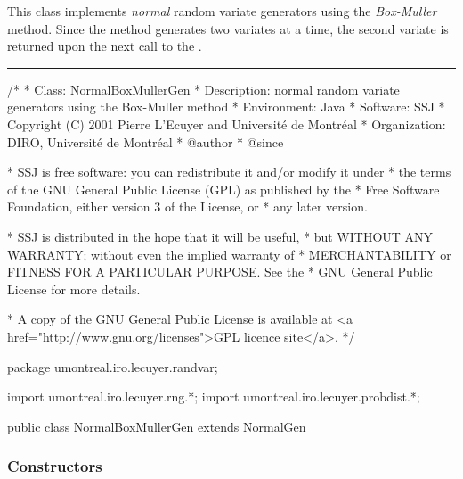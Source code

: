 
This class implements {\em normal\/} random variate generators using
 the {\em Box-Muller\/} method. 
Since the method generates two variates at a time, 
the second variate is returned upon the next call to the .


\bigskip\hrule

\begin{code}
\begin{hide}
/*
 * Class:        NormalBoxMullerGen
 * Description:  normal random variate generators using the Box-Muller method
 * Environment:  Java
 * Software:     SSJ 
 * Copyright (C) 2001  Pierre L'Ecuyer and Université de Montréal
 * Organization: DIRO, Université de Montréal
 * @author       
 * @since

 * SSJ is free software: you can redistribute it and/or modify it under
 * the terms of the GNU General Public License (GPL) as published by the
 * Free Software Foundation, either version 3 of the License, or
 * any later version.

 * SSJ is distributed in the hope that it will be useful,
 * but WITHOUT ANY WARRANTY; without even the implied warranty of
 * MERCHANTABILITY or FITNESS FOR A PARTICULAR PURPOSE.  See the
 * GNU General Public License for more details.

 * A copy of the GNU General Public License is available at
   <a href="http://www.gnu.org/licenses">GPL licence site</a>.
 */
\end{hide}
package umontreal.iro.lecuyer.randvar;\begin{hide}
import umontreal.iro.lecuyer.rng.*;
import umontreal.iro.lecuyer.probdist.*;
\end{hide}

public class NormalBoxMullerGen extends NormalGen \begin{hide} {
   private boolean available = false;
   private double[] variates = new double[2];
   private static double[] staticVariates = new double[2];
   // used by polar method which calculate always two random values; 
  
\end{hide}\end{code}

\subsubsection* {Constructors}

